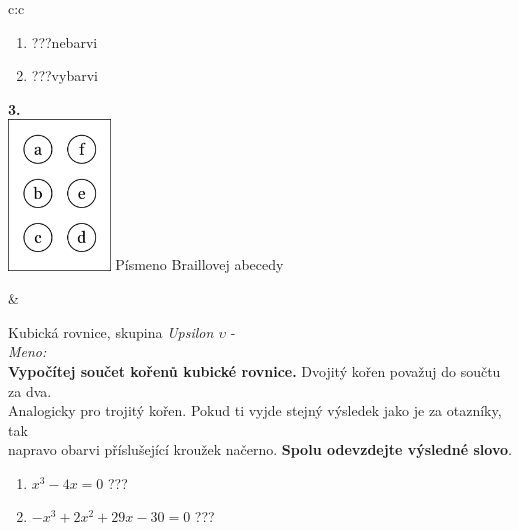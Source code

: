 \documentclass[10pt]{report}
\begin{document}
\begin{tabular}{c:c}
\begin{minipage}[c][99mm][t]{0.49\linewidth}
\begin{center}
\begin{minipage}{0.77\linewidth}
\begin{center}
\begin{varwidth}{\textwidth}
\begin{enumerate}
\item \quad \dotfill\; ???\;\dotfill \quad nebarvi
\item \quad \dotfill\; ???\;\dotfill \quad vybarvi
\end{enumerate}
\end{varwidth}
\end{center}
\end{minipage}
\begin{minipage}{0.20\linewidth}
\begin{center}
{\Huge\bfseries 3.} \\[2mm]
\includegraphics[height=40mm]{../images/braille.png}
{\small Písmeno Braillovej abecedy}
\end{center}
\end{minipage}
\end{center}
\end{minipage}
&
\begin{minipage}[c][99mm][t]{0.49\linewidth}
\begin{center}
\vspace{7mm}
{\huge Kubická rovnice, skupina \textit{Upsilon $\upsilon$} -}\\[4.5mm]
\textit{Meno:}\phantom{xxxxxxxxxxxxxxxxxxxxxxxxxxxxxxxxxxxxxxxxxxxxxxxxxxxxxxxxxxxxxxxxx}\\[3.5mm]
\textbf{Vypočítej součet kořenů kubické rovnice.} Dvojitý kořen považuj do součtu za dva.\\Analogicky pro trojitý kořen. Pokud ti vyjde stejný výsledek jako je za otazníky, tak\\napravo obarvi příslušející kroužek načerno. \textbf{Spolu odevzdejte výsledné slovo}.\\[3mm]
\begin{minipage}{0.77\linewidth}
\begin{center}
\begin{varwidth}{\textwidth}
\begin{enumerate}
\large
\item $x^3-4x=0$\quad \dotfill\; ???\;\dotfill {}
\item $-x^3+2x^2+29x-30=0$\quad \dotfill\; ???\;\dotfill {}

\end{enumerate}
\end{varwidth}
\end{center}
\end{minipage}
\end{center}
\end{minipage}
\end{tabular}
\end{document}
